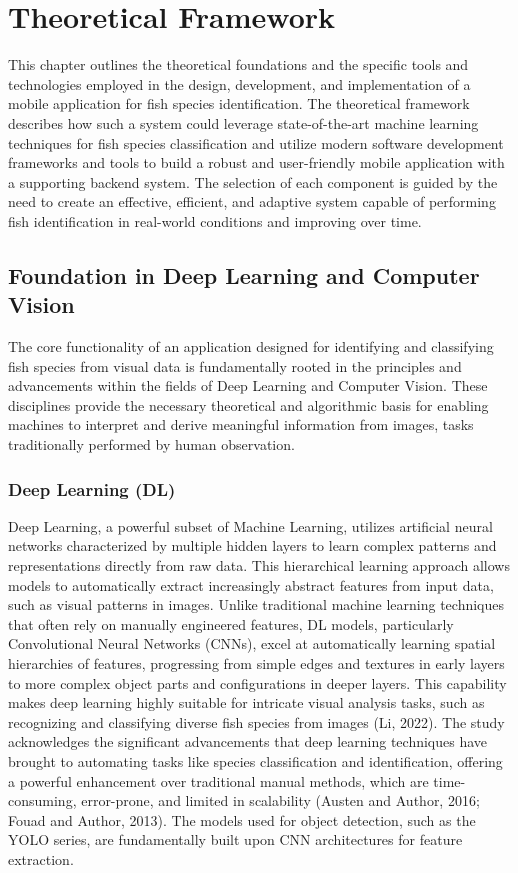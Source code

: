 \chapter{Theoretical Framework}
This chapter outlines the theoretical foundations and the specific tools and technologies employed in the
design, development, and implementation of a mobile application for fish species identification. The theoretical framework describes how such a system could leverage state-of-the-art machine learning techniques for
fish species classification and utilize modern software development frameworks and tools to build a robust
and user-friendly mobile application with a supporting backend system. The selection of each component is
guided by the need to create an effective, efficient, and adaptive system capable of performing fish identification in real-world conditions and improving over time.

\section{Foundation in Deep Learning and Computer Vision}
The core functionality of an application designed for identifying and classifying fish species from visual
data is fundamentally rooted in the principles and advancements within the fields of Deep Learning and
Computer Vision. These disciplines provide the necessary theoretical and algorithmic basis for enabling
machines to interpret and derive meaningful information from images, tasks traditionally performed by
human observation.

\subsection{Deep Learning (DL)}
Deep Learning, a powerful subset of Machine Learning, utilizes artificial neural networks characterized
by multiple hidden layers to learn complex patterns and representations directly from raw data. This
hierarchical learning approach allows models to automatically extract increasingly abstract features from
input data, such as visual patterns in images. Unlike traditional machine learning techniques that often rely
on manually engineered features, DL models, particularly Convolutional Neural Networks (CNNs), excel at
automatically learning spatial hierarchies of features, progressing from simple edges and textures in early
layers to more complex object parts and configurations in deeper layers. This capability makes deep learning
highly suitable for intricate visual analysis tasks, such as recognizing and classifying diverse fish species from
images (Li, 2022). The study acknowledges the significant advancements that deep learning techniques have
brought to automating tasks like species classification and identification, offering a powerful enhancement
over traditional manual methods, which are time-consuming, error-prone, and limited in scalability (Austen
and Author, 2016; Fouad and Author, 2013). The models used for object detection, such as the YOLO
series, are fundamentally built upon CNN architectures for feature extraction.

